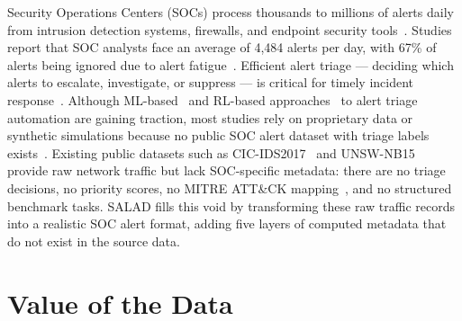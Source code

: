 \documentclass[review]{elsarticle}
\begin{document}
Security Operations Centers (SOCs) process thousands to millions of alerts daily from intrusion detection systems, firewalls, and endpoint security tools~\cite{alahmadi2022socsurvey}. Studies report that SOC analysts face an average of 4,484 alerts per day, with 67\% of alerts being ignored due to alert fatigue~\cite{ponemon2023alert}. Efficient alert triage --- deciding which alerts to escalate, investigate, or suppress --- is critical for timely incident response~\cite{husak2019}. Although ML-based~\cite{zuech2015ids_survey} and RL-based approaches~\cite{cage2022cyborg} to alert triage automation are gaining traction, most studies rely on proprietary data or synthetic simulations because no public SOC alert dataset with triage labels exists~\cite{landauer2024,msguide2024}. Existing public datasets such as CIC-IDS2017~\cite{sharafaldin2018} and UNSW-NB15~\cite{moustafa2015} provide raw network traffic but lack SOC-specific metadata: there are no triage decisions, no priority scores, no MITRE ATT\&CK mapping~\cite{strom2018mitre}, and no structured benchmark tasks. SALAD fills this void by transforming these raw traffic records into a realistic SOC alert format, adding five layers of computed metadata that do not exist in the source data.


\section{Value of the Data}
\end{document}
